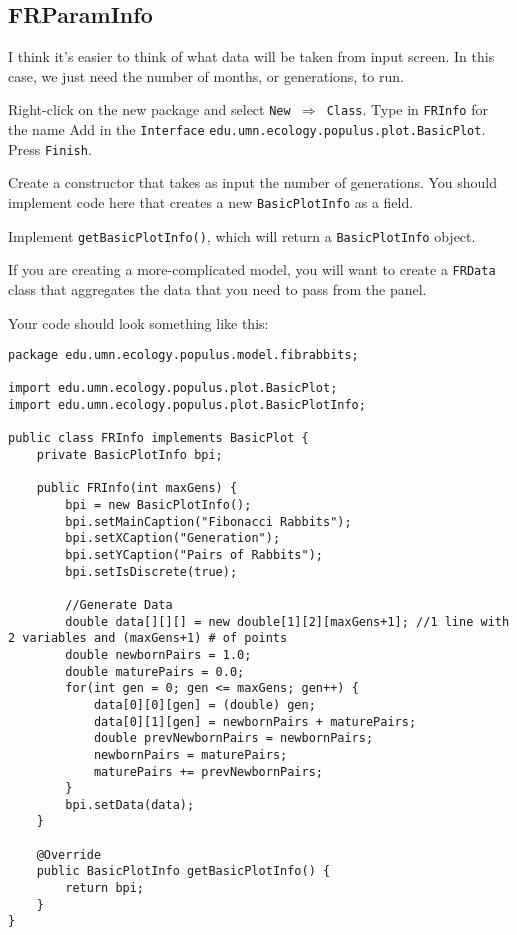 \documentclass[12pt]{article}
\begin{document}
\subsection{FRParamInfo}
I think it's easier to think of what data will be taken from input screen.  In this case, we just need the number of months, or generations, to run.

Right-click on the new package and select \texttt{New $\Rightarrow$ Class}.
Type in \texttt{FRInfo} for the name
Add in the \texttt{Interface} \texttt{edu.umn.ecology.populus.plot.BasicPlot}.
Press \texttt{Finish}.

Create a constructor that takes as input the number of generations.  You should implement code here that creates a new \texttt{BasicPlotInfo} as a field.

Implement \texttt{getBasicPlotInfo()}, which will return a \texttt{BasicPlotInfo} object.

If you are creating a more-complicated model, you will want to create a \texttt{FRData} class that aggregates the data that you need to pass from the panel.

Your code should look something like this:

\begin{verbatim}
package edu.umn.ecology.populus.model.fibrabbits;

import edu.umn.ecology.populus.plot.BasicPlot;
import edu.umn.ecology.populus.plot.BasicPlotInfo;

public class FRInfo implements BasicPlot {
    private BasicPlotInfo bpi;

    public FRInfo(int maxGens) {
        bpi = new BasicPlotInfo();
        bpi.setMainCaption("Fibonacci Rabbits");
        bpi.setXCaption("Generation");
        bpi.setYCaption("Pairs of Rabbits");
        bpi.setIsDiscrete(true);
		
        //Generate Data
        double data[][][] = new double[1][2][maxGens+1]; //1 line with 2 variables and (maxGens+1) # of points
        double newbornPairs = 1.0;
        double maturePairs = 0.0;
        for(int gen = 0; gen <= maxGens; gen++) {
            data[0][0][gen] = (double) gen;
            data[0][1][gen] = newbornPairs + maturePairs;
            double prevNewbornPairs = newbornPairs;
            newbornPairs = maturePairs;
            maturePairs += prevNewbornPairs;
        }
        bpi.setData(data);
    }
	
    @Override
    public BasicPlotInfo getBasicPlotInfo() {
        return bpi;
    }
}
\end{verbatim}
\end{document}
